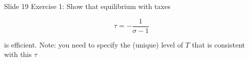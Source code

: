 Slide 19 Exercise 1: Show that equilibrium with taxes

$$
\tau=-\frac{1}{\sigma-1}
$$

is efficient. Note: you need to specify the (unique) level of $T$ that is consistent with this $\tau$